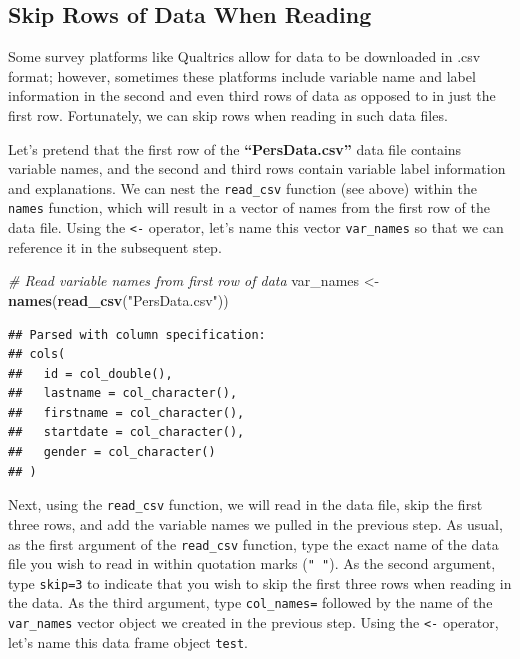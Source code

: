 \documentclass[]{book}
\newenvironment{Shaded}{\begin{snugshade}}{\end{snugshade}}
\newcommand{\KeywordTok}[1]{\textcolor[rgb]{0.13,0.29,0.53}{\textbf{#1}}}
\newcommand{\StringTok}[1]{\textcolor[rgb]{0.31,0.60,0.02}{#1}}
\newcommand{\CommentTok}[1]{\textcolor[rgb]{0.56,0.35,0.01}{\textit{#1}}}
\newcommand{\NormalTok}[1]{#1}
\begin{document}
\subsection{Skip Rows of Data When
Reading}\label{skip-rows-of-data-when-reading}

Some survey platforms like Qualtrics allow for data to be downloaded in
.csv format; however, sometimes these platforms include variable name
and label information in the second and even third rows of data as
opposed to in just the first row. Fortunately, we can skip rows when
reading in such data files.

Let's pretend that the first row of the \textbf{``PersData.csv''} data
file contains variable names, and the second and third rows contain
variable label information and explanations. We can nest the
\texttt{read\_csv} function (see above) within the \texttt{names}
function, which will result in a vector of names from the first row of
the data file. Using the \texttt{\textless{}-} operator, let's name this
vector \texttt{var\_names} so that we can reference it in the subsequent
step.

\begin{Shaded}
\begin{Highlighting}[]
\CommentTok{# Read variable names from first row of data}
\NormalTok{var_names <-}\StringTok{ }\KeywordTok{names}\NormalTok{(}\KeywordTok{read_csv}\NormalTok{(}\StringTok{"PersData.csv"}\NormalTok{))}
\end{Highlighting}
\end{Shaded}

\begin{verbatim}
## Parsed with column specification:
## cols(
##   id = col_double(),
##   lastname = col_character(),
##   firstname = col_character(),
##   startdate = col_character(),
##   gender = col_character()
## )
\end{verbatim}

Next, using the \texttt{read\_csv} function, we will read in the data
file, skip the first three rows, and add the variable names we pulled in
the previous step. As usual, as the first argument of the
\texttt{read\_csv} function, type the exact name of the data file you
wish to read in within quotation marks (\texttt{"\ "}). As the second
argument, type \texttt{skip=3} to indicate that you wish to skip the
first three rows when reading in the data. As the third argument, type
\texttt{col\_names=} followed by the name of the \texttt{var\_names}
vector object we created in the previous step. Using the
\texttt{\textless{}-} operator, let's name this data frame object
\texttt{test}.
\end{document}
